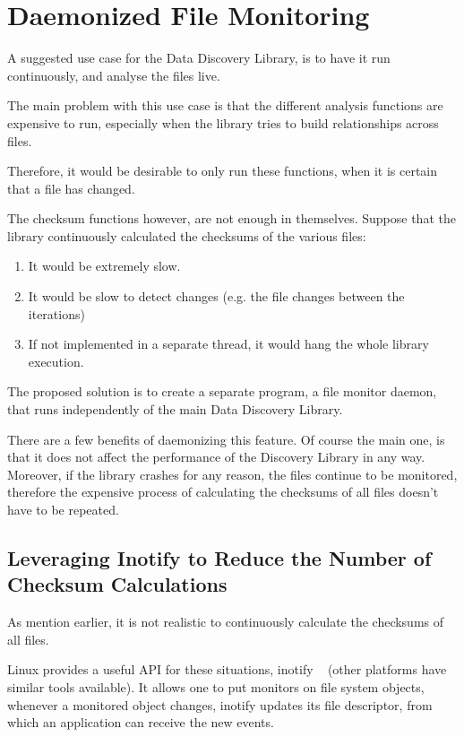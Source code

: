 \section{Daemonized File Monitoring}
A suggested use case for the Data Discovery Library, is to have it run continuously, and analyse the files
live.

The main problem with this use case is that the different analysis functions are expensive to run,
especially when the library tries to build relationships across files.

Therefore, it would be desirable to only run these functions, when it is certain that a file has changed.

The checksum functions however, are not enough in themselves.
Suppose that the library continuously calculated the checksums of the various files:
\begin{enumerate}
    \item It would be extremely slow.
    \item It would be slow to detect changes (e.g. the file changes between the iterations)
    \item If not implemented in a separate thread, it would hang the whole library execution.
\end{enumerate}

The proposed solution is to create a separate program, a file monitor daemon, that runs independently
of the main Data Discovery Library.

There are a few benefits of daemonizing this feature.
Of course the main one, is that it does not affect the performance
of the Discovery Library in any way.
Moreover, if the library crashes for any reason, the files continue to be monitored,
therefore the expensive process of calculating the checksums of all files doesn't have to be repeated.

\subsection{Leveraging Inotify to Reduce the Number of Checksum Calculations}
As mention earlier, it is not realistic to continuously calculate the checksums of all files.

Linux provides a useful API for these situations, inotify ~\cite{Inotify} (other platforms have similar tools available).
It allows one to put monitors on file system objects, whenever a monitored object changes, inotify updates its
file descriptor, from which an application can receive the new events.

